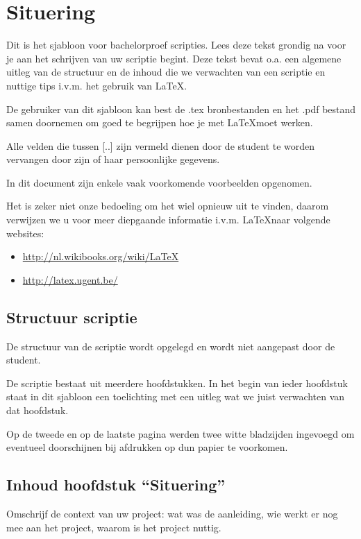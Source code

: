 \chapter[Situering]{Situering}
\label{chap_situering}

Dit is het sjabloon voor bachelorproef scripties. 
Lees deze tekst grondig na voor je aan het schrijven van uw scriptie begint. 
Deze tekst bevat o.a. een algemene uitleg van de structuur en de inhoud die we verwachten van een scriptie en nuttige tips i.v.m. het gebruik van \LaTeX.

De gebruiker van dit sjabloon kan best de .tex bronbestanden en het .pdf bestand samen doornemen om goed te begrijpen hoe je met \LaTeX moet werken.

Alle velden die tussen [..] zijn vermeld dienen door de student te worden vervangen door zijn of haar persoonlijke gegevens.

In dit document zijn enkele vaak voorkomende voorbeelden opgenomen. 

Het is zeker niet onze bedoeling om het wiel opnieuw uit te vinden, daarom verwijzen we u voor meer diepgaande informatie i.v.m. \LaTeX naar volgende websites:

\begin{itemize}
\item \url{http://nl.wikibooks.org/wiki/LaTeX}
\item \url{http://latex.ugent.be/}
\end{itemize}


\section{Structuur scriptie}

De structuur van de scriptie wordt opgelegd en wordt niet aangepast door de student.

De scriptie bestaat uit meerdere hoofdstukken. 
In het begin van ieder hoofdstuk staat in dit sjabloon een toelichting met een uitleg wat we juist verwachten van dat hoofdstuk.

Op de tweede en op de laatste pagina werden twee witte bladzijden ingevoegd om eventueel doorschijnen bij afdrukken op dun papier te voorkomen.


\section{Inhoud hoofdstuk ``Situering''}

Omschrijf de context van uw project: wat was de aanleiding, wie werkt er nog mee aan het project, waarom is het project nuttig.


